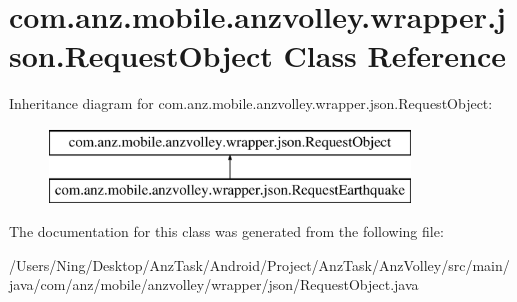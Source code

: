 \hypertarget{classcom_1_1anz_1_1mobile_1_1anzvolley_1_1wrapper_1_1json_1_1_request_object}{\section{com.\+anz.\+mobile.\+anzvolley.\+wrapper.\+json.\+Request\+Object Class Reference}
\label{classcom_1_1anz_1_1mobile_1_1anzvolley_1_1wrapper_1_1json_1_1_request_object}
}
Inheritance diagram for com.\+anz.\+mobile.\+anzvolley.\+wrapper.\+json.\+Request\+Object\+:\begin{figure}[H]
\begin{center}
\leavevmode
\includegraphics[height=2.000000cm]{classcom_1_1anz_1_1mobile_1_1anzvolley_1_1wrapper_1_1json_1_1_request_object}
\end{center}
\end{figure}


The documentation for this class was generated from the following file\+:\begin{DoxyCompactItemize}
\item 
/\+Users/\+Ning/\+Desktop/\+Anz\+Task/\+Android/\+Project/\+Anz\+Task/\+Anz\+Volley/src/main/java/com/anz/mobile/anzvolley/wrapper/json/Request\+Object.\+java\end{DoxyCompactItemize}
